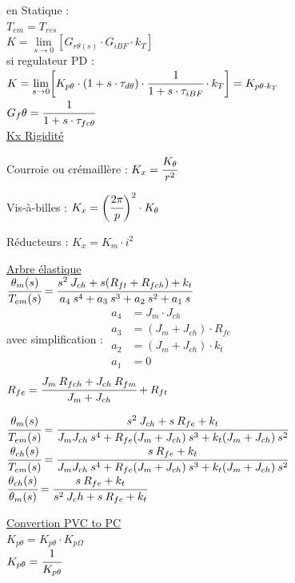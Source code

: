 \documentclass[	DIV=calc,%
							paper=a4,%
							fontsize=10pt,%
							twocolumn]{scrartcl} %
\newcommand{\formtitle}[1]{\large\underline{#1}}
\begin{document}
en Statique : \\
$T_{em} = T_{res}$\\

$K = \lim\limits_{s \rightarrow 0}[G_{r\theta(s)}\cdot G_{iBF}\cdot k_T]$\\

si regulateur PD : \\

$K = \lim\limits_{s \rightarrow 0}\biggl[K_{p\theta} \cdot (1+s\cdot\tau_{d\theta}) \cdot \cfrac{1}{1+s\cdot\tau_{iBF}} \cdot k_T\biggr] = K_{p\theta \cdot k_T}$\\

$G_f\theta = \cfrac{1}{1+s\cdot\tau_{fc\theta}}$\\

\formtitle{Kx Rigidité}

\vspace{3mm}

Courroie ou crémaillère : $K_x = \cfrac{K_\theta}{r^2}$

\vspace{3mm}

Vis-à-billes : $K_x = \bigg(\cfrac{2\pi}{p}\bigg)^2 \cdot K_\theta$


\vspace{3mm}

Réducteurs : $K_x = K_m \cdot i^2$ 

\vspace{3mm}

\underline{Arbre élastique }\\

$\cfrac{\theta_m(s)}{T_{em}(s)} = \cfrac{s^2\:J_{ch} + s(R_{ft} + R_{fch}) + k_t}{a_4\: s^4 + a_3\: s^3 + a_2 \:s^2 + a_1 \:s}$\\

avec simplification : 
{\normalsize
$
    \begin{aligned}
        a_4 &= J_m \cdot J_{ch}\\
        a_3 &=( J_m + J_{ch}) \cdot R_{fe}\\
        a_2 &= (J_m + J_{ch})\cdot k_t\\
        a_1 &= 0\\
    \end{aligned}
$
}\\

$R_{fe} = \cfrac{J_m \: R_{fch} + J_{ch}\:R_{fm}}{J_m + J_{ch}} + R_{ft}$

{\normalsize
$\cfrac{\theta_m(s)}{T_{em}(s)} = \cfrac{s^2\:J_{ch} + s\:R_{fe} + k_t}{J_mJ_{ch}\: s^4 + R_{fe}(J_m+J_{ch})\: s^3 + k_t(J_m+J_{ch}) \:s^2 }$\\


$\cfrac{\theta_{ch}(s)}{T_{em}(s)} = \cfrac{s\:R_{fe} + k_t}{J_mJ_{ch}\: s^4 + R_{fe}(J_m+J_{ch})\: s^3 + k_t(J_m+J_{ch}) \:s^2 }$\\


$\cfrac{\theta_{ch}(s)}{\theta_m(s)} = \cfrac{s\:R_{fe} + k_t}{s^2\: J_ch + s\:R_{fe} + k_t}$\\
}

\formtitle{Convertion PVC to PC }\\

$K_{p\theta} =  K_{p\theta} \cdot K_{p\Omega}$\\


$K_{p\theta} =  \cfrac{1}{K_{p\theta}}$
\end{document}
